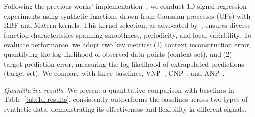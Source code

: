 Following the previous works' implementation~\citep{guo2023versatile,kim2019attentive}, we conduct 1D signal regression experiments using synthetic functions drawn from Gaussian processes (GPs) with RBF and Matern kernels. This kernel selection, as advocated by~\citet{kim2022neural}, ensures diverse function characteristics spanning smoothness, periodicity, and local variability. To evaluate performance, we adopt two key metrics: (1) context reconstruction error, quantifying the log-likelihood of observed data points (context set), and (2) target prediction error, measuring the log-likelihood of extrapolated predictions (target set). We compare with three baselines, VNP~\citep{guo2023versatile}, CNP~\citep{garnelo2018conditional}, and ANP~\citep{kim2019attentive}. 


\emph{Quantitative results.}
We present a quantitative comparison with baselines in Table~\ref{tab:1d-results}. \name{} consistently outperforms the baselines across two types of synthetic data, demonstrating its effectiveness and flexibility in different signals. %





